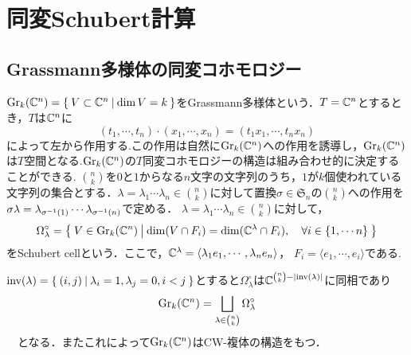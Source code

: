 \section{同変Schubert計算}
\subsection{Grassmann多様体の同変コホモロジー}
$\text{Gr}_k(\mathbb{C}^n)=\left\{\:V\subset \mathbb{C}^n\:\middle|\:\dim V = k\:\right\}$をGrassmann多様体という．$T=\mathbb{C}^n$とするとき，$T$は$\mathbb{C}^n$に
\[
(t_1,\cdots,t_n)\cdot(x_1,\cdots,x_n)=(t_1x_1,\cdots,t_nx_n)
\]
によって左から作用する.この作用は自然に$\text{Gr}_k(\mathbb{C}^n)$への作用を誘導し，$\text{Gr}_k(\mathbb{C}^n)$は$T$空間となる.$\text{Gr}_k(\mathbb{C}^n)$の$T$同変コホモロジーの構造は組み合わせ的に決定することができる.
$\binom{n}{k}$を$0$と$1$からなる$n$文字の文字列のうち，$1$が$k$個使われている文字列の集合とする．$\lambda=\lambda_1\cdots \lambda_n\in\binom{n}{k}$に対して置換$\sigma\in\mathfrak{S}_n$の$\binom{n}{k}$への作用を$\sigma\lambda=\lambda_{\sigma^{-1}(1)}\cdots\lambda_{\sigma^{-1}(n)}$で定める．
$\lambda=\lambda_1\cdots \lambda_n\in\binom{n}{k}$に対して，
\[
\Omega_\lambda^\circ=\left\{\:V\in \text{Gr}_k(\mathbb{C}^n)\:\middle|\:\dim(V\cap F_i)= \dim(\mathbb{C}^{\lambda}\cap F_i),\quad \forall i\in \{1,\cdots n\}\:\right\}
\]
をSchubert cellという．ここで，$\mathbb{C}^{\lambda}=\langle\lambda_{1}e_{1},\cdots,\lambda_ne_n\rangle$， $F_i=\langle e_{1},\cdots,e_i\rangle$である. 

\begin{prop}
  $\text{inv}(\lambda)=\left\{\:(i,j)\:\middle|\:\lambda_i=1, \lambda_j=0, i<j\:\right\}$とすると$\Omega_\lambda^\circ$は$\mathbb{C}^{\binom{n}{k}-|\text{inv}(\lambda)|}$に同相であり
\[
\text{Gr}_k(\mathbb{C}^n)=\bigsqcup_{\lambda\in\binom{n}{k}}\Omega_\lambda^\circ
\]
　となる．またこれによって$\text{Gr}_k(\mathbb{C}^n)$はCW-複体の構造をもつ．
\end{prop}

